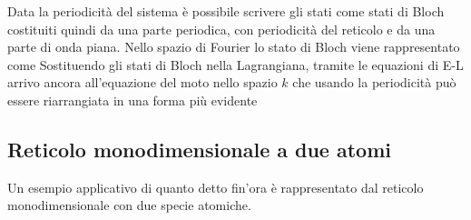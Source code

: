 Data la periodicità del sistema \`e possibile scrivere gli stati come stati di Bloch costituiti quindi da una parte periodica, con periodicità del reticolo e da una parte di onda piana. Nello spazio di Fourier lo stato di Bloch viene rappresentato come
Sostituendo gli stati di Bloch nella Lagrangiana, tramite le equazioni di E-L arrivo ancora all'equazione del moto nello spazio $k$
che usando la periodicità può essere riarrangiata in una forma più evidente


\subsection{Reticolo monodimensionale a due atomi}
Un esempio applicativo di quanto detto fin'ora è rappresentato dal reticolo monodimensionale con due specie atomiche.

